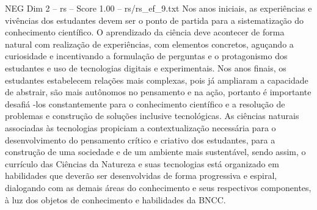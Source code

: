 \begin{textsample}{NEG Dim 2 – rs – Score 1.00 – rs/rs\_ef\_9.txt}
Nos anos iniciais, as experiências e vivências dos estudantes devem ser o ponto de partida para a sistematização do conhecimento científico.
O aprendizado da ciência deve acontecer de forma natural com realização de experiências, com elementos concretos, aguçando a curiosidade e incentivando a formulação de perguntas e o protagonismo dos estudantes e uso de tecnologias digitais e experimentais.
Nos anos finais, os estudantes estabelecem relações mais complexas, pois já ampliaram a capacidade de abstrair, são mais autônomos no pensamento e na ação, portanto é importante desafiá -los constantemente para o conhecimento científico e a resolução de problemas e construção de soluções inclusive tecnológicas.
As ciências naturais associadas às tecnologias propiciam a contextualização necessária para o desenvolvimento do pensamento crítico e criativo dos estudantes, para a construção de uma sociedade e de um ambiente mais sustentável, sendo assim, o currículo das Ciências da Natureza e suas tecnologias está organizado em habilidades que deverão ser desenvolvidas de forma progressiva e espiral, dialogando com as demais áreas do conhecimento e seus respectivos componentes, à luz dos objetos de conhecimento e habilidades da BNCC.

\end{textsample}

